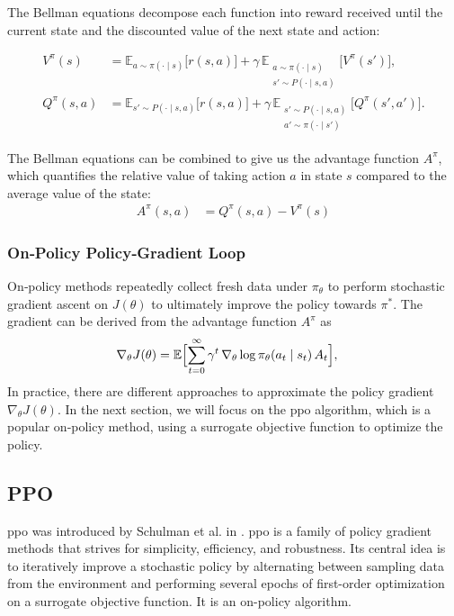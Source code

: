 The Bellman equations decompose each function into reward received until the current state and the discounted value of the next state and action:

\begin{align}
\label{eq:BellmanV}
V^\pi(s)
&= \mathbb{E}_{a\sim\pi(\cdot\mid s)}\bigl[r(s,a)\bigr]
  + \gamma\,\mathbb{E}_{\substack{a\sim\pi(\cdot\mid s)\\s'\sim P(\cdot\mid s,a)}}\bigl[V^\pi(s')\bigr],\\[4pt]
\label{eq:BellmanQ}
Q^\pi(s,a)
&= \mathbb{E}_{s'\sim P(\cdot\mid s,a)}\bigl[r(s,a)\bigr]
  + \gamma\,\mathbb{E}_{\substack{s'\sim P(\cdot\mid s,a)\\a'\sim\pi(\cdot\mid s')}}\bigl[Q^\pi(s',a')\bigr].
\end{align}

The Bellman equations can be combined to give us the advantage function \(A^\pi\), which quantifies the relative value of taking action \(a\) in state \(s\) compared to the average value of the state:
\begin{align}
\label{eq:advantage}
A^\pi(s,a)
&= Q^\pi(s,a) - V^\pi(s)
\end{align}

\subsubsection{On‐Policy Policy‐Gradient Loop}  
On‐policy methods repeatedly collect fresh data under \(\pi_\theta\) to perform stochastic gradient ascent on \(J(\theta)\) to ultimately improve the policy towards \(\pi^*\). The gradient can be derived from the advantage function \(A^\pi\) as
\begin{align}
\label{eq:policy_gradient}
\nabla_\theta J(\theta)
&= \mathbb{E}\Bigl[\sum_{t=0}^\infty \gamma^t\,\nabla_\theta \log \pi_\theta(a_t\mid s_t)\,A_t\Bigr],
\end{align}
In practice, there are different approaches to approximate the policy gradient \(\nabla_{\theta}J(\theta)\). In the next section, we will focus on the \gls{ppo} algorithm, which is a popular on‐policy method, using a surrogate objective function to optimize the policy.

\subsection{PPO}
\gls{ppo} was introduced by Schulman et al. in \cite{schulman2017proximal}. \gls{ppo} is a family of policy gradient methods that strives for simplicity, efficiency, and robustness. Its central idea is to iteratively improve a stochastic policy by alternating between sampling data from the environment and performing several epochs of first-order optimization on a surrogate objective function. It is an on-policy algorithm.

